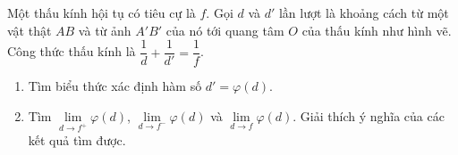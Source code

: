 \begin{ex}%
	Một thấu kính hội tụ có tiêu cự là $f$. Gọi $d$ và $d'$ lần lượt là khoảng cách  từ một vật thật $AB$ và từ ảnh $A'B'$ của nó tới quang tâm $O$ của thấu kính như hình vẽ. Công thức thấu kính là $\dfrac{1}{d}+\dfrac{1}{d'}=\dfrac{1}{f}$.
	\begin{enumerate}
		\item Tìm biểu  thức xác định hàm số $d'=\varphi (d)$.
		\item Tìm $\lim\limits_{d\to f^+} \varphi (d)$, $\lim\limits_{d\to  f^-}\varphi (d)$ và $\lim\limits_{d\to f}\varphi (d)$. Giải thích ý nghĩa của các kết quả tìm được.
	\end{enumerate}
\end{ex}

